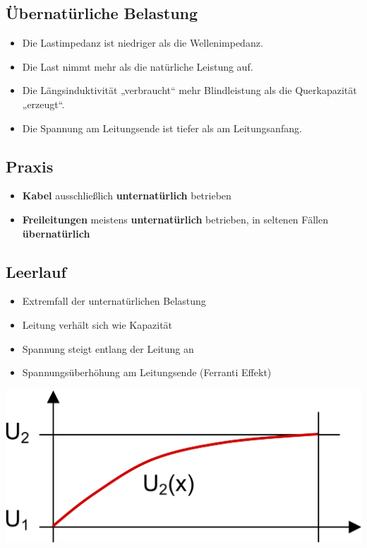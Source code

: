 \subsection{Übernatürliche Belastung}

\begin{itemize}
    \item Die Lastimpedanz ist niedriger als die Wellenimpedanz.
    \item Die Last nimmt mehr als die natürliche Leistung auf.
    \item Die Längsinduktivität „verbraucht“ mehr Blindleistung als die Quer­kapazität „erzeugt“.
    \item Die Spannung am Leitungsende ist tiefer als am Leitungsanfang.
\end{itemize}


\subsection{Praxis}

\begin{itemize}
    \item \textbf{Kabel} ausschließlich \textbf{unternatürlich} betrieben
    \item \textbf{Freileitungen} meistens \textbf{unternatürlich} betrieben, in seltenen Fällen \textbf{übernatürlich}
\end{itemize}


\subsection{Leerlauf}

\begin{itemize}
    \item Extremfall der unternatürlichen Belastung
    \item Leitung verhält sich wie Kapazität
    \item Spannung steigt entlang der Leitung an
    \item Spannungsüberhöhung am Leitungsende (Ferranti Effekt)
\end{itemize}

\vspace{0.15cm}

\includegraphics[width=0.75\columnwidth, align=c]{images/Leerlauf.png}

